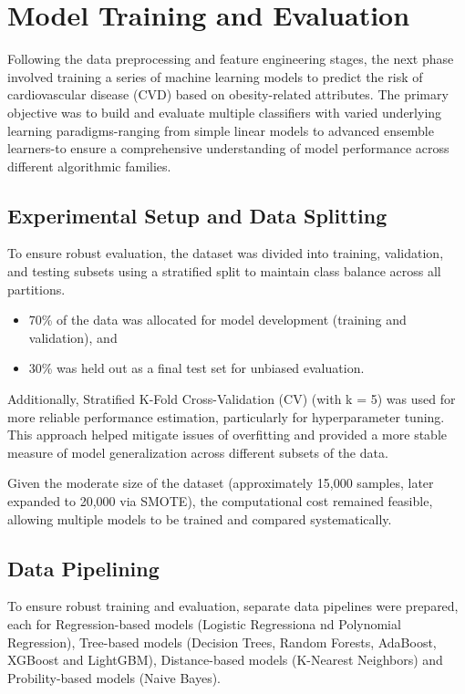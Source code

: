 \chapter{Model Training and Evaluation}\label{ch:model-training-and-evaluations}

Following the data preprocessing and feature engineering stages, the next phase involved training a series of machine learning models to predict the risk of cardiovascular disease (CVD) based on obesity-related attributes.
The primary objective was to build and evaluate multiple classifiers with varied underlying learning paradigms-ranging from simple linear models to advanced ensemble learners-to ensure a comprehensive understanding of model performance across different algorithmic families.


\section{Experimental Setup and Data Splitting}\label{sec:experimental-setup-and-data-splitting}
To ensure robust evaluation, the dataset was divided into training, validation, and testing subsets using a stratified split to maintain class balance across all partitions.

\begin{itemize}
    \item 70\% of the data was allocated for model development (training and validation), and
    \item 30\% was held out as a final test set for unbiased evaluation.
\end{itemize}

Additionally, Stratified K-Fold Cross-Validation (CV) (with k = 5) was used for more reliable performance estimation, particularly for hyperparameter tuning.
This approach helped mitigate issues of overfitting and provided a more stable measure of model generalization across different subsets of the data.

Given the moderate size of the dataset (approximately 15,000 samples, later expanded to 20,000 via SMOTE), the computational cost remained feasible, allowing multiple models to be trained and compared systematically.

\section{Data Pipelining}\label{sec:data_pipelining}
To ensure robust training and evaluation, separate data pipelines were prepared, each for Regression-based models (Logistic Regressiona nd Polynomial Regression), Tree-based models (Decision Trees, Random Forests, AdaBoost, XGBoost and LightGBM), Distance-based models (K-Nearest Neighbors) and Probility-based models (Naive Bayes).

